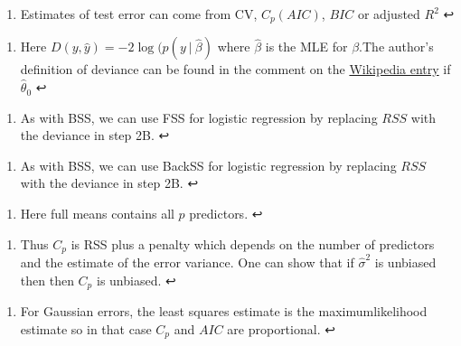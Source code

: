 \documentclass[11pt]{article}
\providecommand{\tightlist}{%
      \setlength{\itemsep}{0pt}\setlength{\parskip}{0pt}}
\begin{document}
\hypertarget{foot36}{}
\begin{enumerate}
\def\labelenumi{\arabic{enumi}.}
\setcounter{enumi}{35}
\tightlist
\item
  Estimates of test error can come from CV, \(C_p (AIC)\), \(BIC\) or
  adjusted \(R^2\) ↩
\end{enumerate}

\hypertarget{foot37}{}
\begin{enumerate}
\def\labelenumi{\arabic{enumi}.}
\setcounter{enumi}{36}
\tightlist
\item
  Here \(D(y, \hat{y}) = -2\log(p(y\ |\ \hat{\beta})\) where
  \(\hat{\beta}\) is the MLE for \(\beta\).The author's definition of
  deviance can be found in the comment on the
  \href{https://en.wikipedia.org/wiki/Deviance_(statistics)}{Wikipedia
  entry} if \(\hat{\theta}_0\) ↩
\end{enumerate}

\hypertarget{foot38}{}
\begin{enumerate}
\def\labelenumi{\arabic{enumi}.}
\setcounter{enumi}{37}
\tightlist
\item
  As with BSS, we can use FSS for logistic regression by replacing
  \(RSS\) with the deviance in step 2B. ↩
\end{enumerate}

\hypertarget{foot38}{}
\begin{enumerate}
\def\labelenumi{\arabic{enumi}.}
\setcounter{enumi}{38}
\tightlist
\item
  As with BSS, we can use BackSS for logistic regression by replacing
  \(RSS\) with the deviance in step 2B. ↩
\end{enumerate}

\hypertarget{foot40}{}
\begin{enumerate}
\def\labelenumi{\arabic{enumi}.}
\setcounter{enumi}{39}
\tightlist
\item
  Here full means contains all \(p\) predictors. ↩
\end{enumerate}

\hypertarget{foot41}{}
\begin{enumerate}
\def\labelenumi{\arabic{enumi}.}
\setcounter{enumi}{40}
\tightlist
\item
  Thus \(C_p\) is RSS plus a penalty which depends on the number of
  predictors and the estimate of the error variance. One can show that
  if \(\hat{\sigma}^2\) is unbiased then then \(C_p\) is unbiased. ↩
\end{enumerate}

\hypertarget{foot42}{}
\begin{enumerate}
\def\labelenumi{\arabic{enumi}.}
\setcounter{enumi}{41}
\tightlist
\item
  For Gaussian errors, the least squares estimate is the
  maximumlikelihood estimate so in that case \(C_p\) and \(AIC\) are
  proportional. ↩
\end{enumerate}
\end{document}
